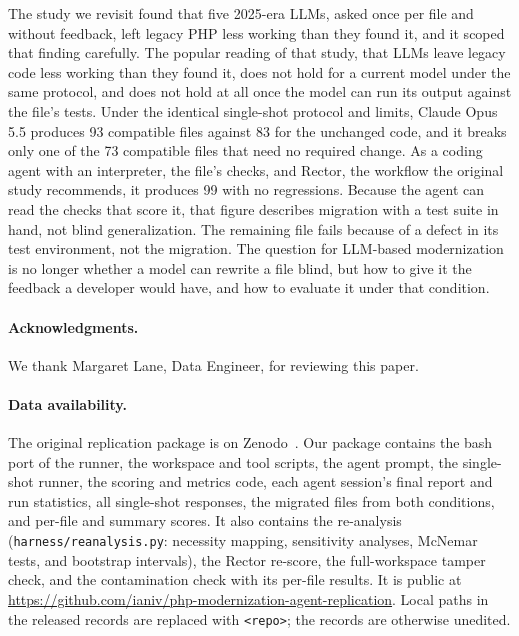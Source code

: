 \documentclass[11pt]{article}
\newcommand{\code}[1]{\texttt{#1}}
\begin{document}
The study we revisit found that five 2025-era LLMs, asked once per file and without feedback, left legacy PHP less working than they found it, and it scoped that finding carefully.
The popular reading of that study, that LLMs leave legacy code less working than they found it, does not hold for a current model under the same protocol, and does not hold at all once the model can run its output against the file's tests.
Under the identical single-shot protocol and limits, Claude Opus 5.5 produces 93 compatible files against 83 for the unchanged code, and it breaks only one of the 73 compatible files that need no required change.
As a coding agent with an interpreter, the file's checks, and Rector, the workflow the original study recommends, it produces 99 with no regressions.
Because the agent can read the checks that score it, that figure describes migration with a test suite in hand, not blind generalization.
The remaining file fails because of a defect in its test environment, not the migration.
The question for LLM-based modernization is no longer whether a model can rewrite a file blind, but how to give it the feedback a developer would have, and how to evaluate it under that condition.

\paragraph{Acknowledgments.}
We thank Margaret Lane, Data Engineer, for reviewing this paper.

\paragraph{Data availability.}
The original replication package is on Zenodo~\cite{mahmud2026package}.
Our package contains the bash port of the runner, the workspace and tool scripts, the agent prompt, the single-shot runner, the scoring and metrics code, each agent session's final report and run statistics, all single-shot responses, the migrated files from both conditions, and per-file and summary scores.
It also contains the re-analysis (\code{harness/reanalysis.py}: necessity mapping, sensitivity analyses, McNemar tests, and bootstrap intervals), the Rector re-score, the full-workspace tamper check, and the contamination check with its per-file results.
It is public at \url{https://github.com/ianiv/php-modernization-agent-replication}.
Local paths in the released records are replaced with \code{<repo>}; the records are otherwise unedited.



\end{document}
